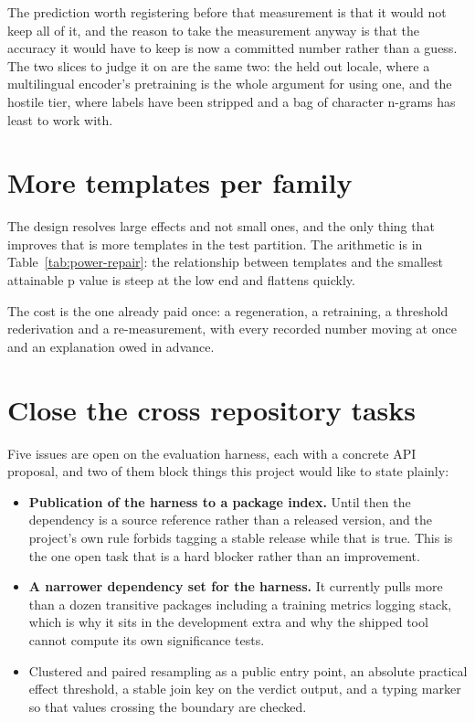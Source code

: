 The prediction worth registering before that measurement is that it would not
keep all of it, and the reason to take the measurement anyway is that the
accuracy it would have to keep is now a committed number rather than a guess. The
two slices to judge it on are the same two: the held out locale, where a
multilingual encoder's pretraining is the whole argument for using one, and the
hostile tier, where labels have been stripped and a bag of character n-grams has
least to work with.

\section{More templates per family}

The design resolves large effects and not small ones, and the only thing that
improves that is more templates in the test partition. The arithmetic is in
Table~\ref{tab:power-repair}: the relationship between templates and the smallest
attainable p value is steep at the low end and flattens quickly.

The cost is the one already paid once: a regeneration, a retraining, a threshold
rederivation and a re-measurement, with every recorded number moving at once and
an explanation owed in advance.

\section{Close the cross repository tasks}

Five issues are open on the evaluation harness, each with a concrete API
proposal, and two of them block things this project would like to state
plainly:

\begin{itemize}
  \item \textbf{Publication of the harness to a package index.} Until then the
    dependency is a source reference rather than a released version, and the
    project's own rule forbids tagging a stable release while that is true. This
    is the one open task that is a hard blocker rather than an improvement.
  \item \textbf{A narrower dependency set for the harness.} It currently pulls
    more than a dozen transitive packages including a training metrics logging
    stack, which is why it sits in the development extra and why the shipped tool
    cannot compute its own significance tests.
  \item Clustered and paired resampling as a public entry point, an absolute
    practical effect threshold, a stable join key on the verdict output, and a
    typing marker so that values crossing the boundary are checked.
\end{itemize}

